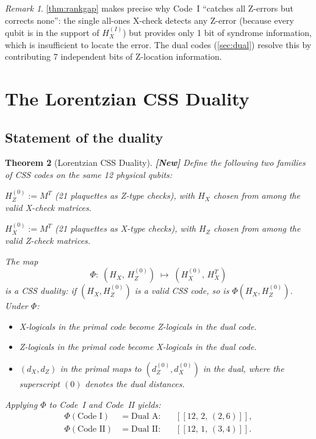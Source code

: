 \documentclass[12pt,a4paper]{article}
\theoremstyle{plain}
\newtheorem{theorem}{Theorem}[section]
\theoremstyle{definition}
\theoremstyle{remark}
\newtheorem{remark}[theorem]{Remark}
\newcommand{\NEW}{\textcolor{newcolor}{\textbf{[New]}}}
\begin{document}
\begin{remark}
\cref{thm:rankgap} makes precise why Code~I ``catches all Z-errors
but corrects none'': the single all-ones X-check detects any Z-error
(because every qubit is in the support of $H_X^{(I)}$) but provides
only 1 bit of syndrome information, which is insufficient to locate
the error. The dual codes (\cref{sec:dual}) resolve this by
contributing 7 independent bits of Z-location information.
\end{remark}

\section{The Lorentzian CSS Duality}\label{sec:duality}

\subsection{Statement of the duality}

\begin{theorem}[Lorentzian CSS Duality]\label{thm:duality}
\NEW\; Define the following two families of CSS codes on the same
12 physical qubits:

\begin{description}[style=nextline,labelindent=0pt]
\item[Primal family] $H_Z^{(0)} := M^T$ (21 plaquettes as Z-type checks),
  with $H_X$ chosen from among the valid X-check matrices.
\item[Dual family] $H_X^{(0)} := M^T$ (21 plaquettes as X-type checks),
  with $H_Z$ chosen from among the valid Z-check matrices.
\end{description}

The map
\[
\Phi:\; (H_X,\, H_Z^{(0)}) \;\longmapsto\; (H_X^{(0)},\, H_X^T)
\]
is a \emph{CSS duality}: if $(H_X, H_Z^{(0)})$ is a valid CSS code,
so is $\Phi(H_X, H_Z^{(0)})$.
Under $\Phi$:
\begin{itemize}[noitemsep]
\item X-logicals in the primal code become Z-logicals in the dual code.
\item Z-logicals in the primal code become X-logicals in the dual code.
\item $(d_X, d_Z)$ in the primal maps to $(d_Z^{(0)}, d_X^{(0)})$
  in the dual, where the superscript $(0)$ denotes the dual distances.
\end{itemize}

Applying $\Phi$ to Code~I and Code~II yields:
\begin{align*}
\Phi(\text{Code~I}) &= \text{Dual~A}: && [[12,\,2,\,(2,6)]], \\
\Phi(\text{Code~II}) &= \text{Dual~II}: && [[12,\,1,\,(3,4)]].
\end{align*}
\end{theorem}
\end{document}

